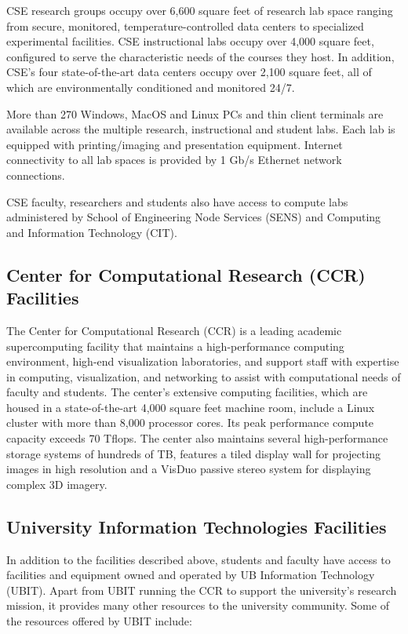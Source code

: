 \medskip \noindent
CSE research groups occupy over 6,600 square feet of research lab space ranging from secure, monitored, temperature-controlled data centers to specialized experimental facilities.
CSE instructional labs occupy over 4,000 square feet, configured to serve the characteristic needs of the courses they host.
In addition, CSE's four state-of-the-art data centers occupy over 2,100 square feet, all of which are environmentally conditioned and monitored 24/7. 

More than 270 Windows, MacOS and Linux PCs and thin client terminals are available across the multiple research, instructional and student labs.
Each lab is equipped with printing/imaging and presentation equipment.
Internet connectivity to all lab spaces is provided by 1 Gb/s Ethernet network connections.

CSE faculty, researchers and students also have access to compute labs administered by School of Engineering Node Services (SENS) and Computing and Information Technology (CIT).

\subsection*{Center for Computational Research (CCR) Facilities}

The Center for Computational Research (CCR) is a leading academic supercomputing facility that maintains a high-performance computing environment, high-end visualization laboratories, and support staff with expertise in computing, visualization, and networking to assist with computational needs of faculty and students.
The center's extensive computing facilities, which are housed in a state-of-the-art 4,000 square feet machine room, include a Linux cluster with more than 8,000 processor cores.
Its peak performance compute capacity exceeds 70 Tflops.
The center also maintains several high-performance storage systems of hundreds of TB, features a tiled display wall for projecting images in high resolution and a VisDuo passive stereo system for displaying complex 3D imagery. 

\subsection*{University Information Technologies Facilities}

In addition to the facilities described above, students and faculty have access to facilities and equipment owned and operated by UB Information Technology (UBIT).
Apart from UBIT running the CCR to support the university's research mission, it provides many other resources to the university community.
Some of the resources offered by UBIT include:

